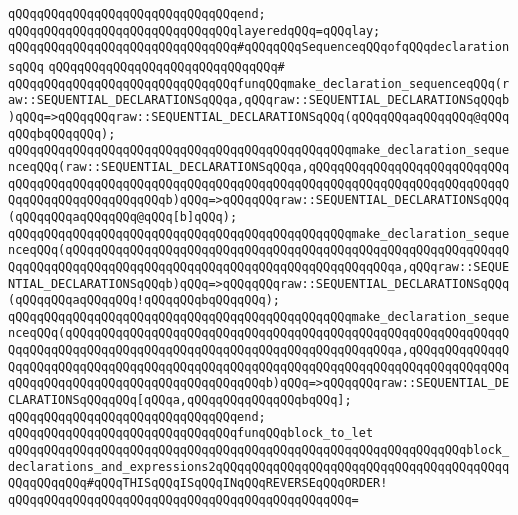 \verb|qQQqqQQqqQQqqQQqqQQqqQQqqQQqqQQqend;|\newline
\newline
\verb|qQQqqQQqqQQqqQQqqQQqqQQqqQQqqQQqlayeredqQQq=qQQqlay;|\newline
\newline
\verb|qQQqqQQqqQQqqQQqqQQqqQQqqQQqqQQq#qQQqqQQqSequenceqQQqofqQQqdeclarationsqQQq|\newline
\verb|qQQqqQQqqQQqqQQqqQQqqQQqqQQqqQQq#|\newline
\verb|qQQqqQQqqQQqqQQqqQQqqQQqqQQqqQQqfunqQQqmake_declaration_sequenceqQQq(raw::SEQUENTIAL_DECLARATIONSqQQqa,qQQqraw::SEQUENTIAL_DECLARATIONSqQQqb)qQQq=>qQQqqQQqraw::SEQUENTIAL_DECLARATIONSqQQq(qQQqqQQqaqQQqqQQq@qQQqqQQqbqQQqqQQq);|\newline
\verb|qQQqqQQqqQQqqQQqqQQqqQQqqQQqqQQqqQQqqQQqqQQqqQQqmake_declaration_sequenceqQQq(raw::SEQUENTIAL_DECLARATIONSqQQqa,qQQqqQQqqQQqqQQqqQQqqQQqqQQqqQQqqQQqqQQqqQQqqQQqqQQqqQQqqQQqqQQqqQQqqQQqqQQqqQQqqQQqqQQqqQQqqQQqqQQqqQQqqQQqqQQqqQQqqQQqb)qQQq=>qQQqqQQqraw::SEQUENTIAL_DECLARATIONSqQQq(qQQqqQQqaqQQqqQQq@qQQq[b]qQQq);|\newline
\verb|qQQqqQQqqQQqqQQqqQQqqQQqqQQqqQQqqQQqqQQqqQQqqQQqmake_declaration_sequenceqQQq(qQQqqQQqqQQqqQQqqQQqqQQqqQQqqQQqqQQqqQQqqQQqqQQqqQQqqQQqqQQqqQQqqQQqqQQqqQQqqQQqqQQqqQQqqQQqqQQqqQQqqQQqqQQqqQQqqQQqa,qQQqraw::SEQUENTIAL_DECLARATIONSqQQqb)qQQq=>qQQqqQQqraw::SEQUENTIAL_DECLARATIONSqQQq(qQQqqQQqaqQQqqQQq!qQQqqQQqbqQQqqQQq);|\newline
\verb|qQQqqQQqqQQqqQQqqQQqqQQqqQQqqQQqqQQqqQQqqQQqqQQqmake_declaration_sequenceqQQq(qQQqqQQqqQQqqQQqqQQqqQQqqQQqqQQqqQQqqQQqqQQqqQQqqQQqqQQqqQQqqQQqqQQqqQQqqQQqqQQqqQQqqQQqqQQqqQQqqQQqqQQqqQQqqQQqqQQqa,qQQqqQQqqQQqqQQqqQQqqQQqqQQqqQQqqQQqqQQqqQQqqQQqqQQqqQQqqQQqqQQqqQQqqQQqqQQqqQQqqQQqqQQqqQQqqQQqqQQqqQQqqQQqqQQqqQQqqQQqb)qQQq=>qQQqqQQqraw::SEQUENTIAL_DECLARATIONSqQQqqQQq[qQQqa,qQQqqQQqqQQqqQQqbqQQq];|\newline
\verb|qQQqqQQqqQQqqQQqqQQqqQQqqQQqqQQqend;|\newline
\newline
\newline
\verb|qQQqqQQqqQQqqQQqqQQqqQQqqQQqqQQqfunqQQqblock_to_let|\newline
\verb|qQQqqQQqqQQqqQQqqQQqqQQqqQQqqQQqqQQqqQQqqQQqqQQqqQQqqQQqqQQqqQQqblock_declarations_and_expressions2qQQqqQQqqQQqqQQqqQQqqQQqqQQqqQQqqQQqqQQqqQQqqQQqqQQq#qQQqTHISqQQqISqQQqINqQQqREVERSEqQQqORDER!|\newline
\verb|qQQqqQQqqQQqqQQqqQQqqQQqqQQqqQQqqQQqqQQqqQQqqQQq=|\newline
